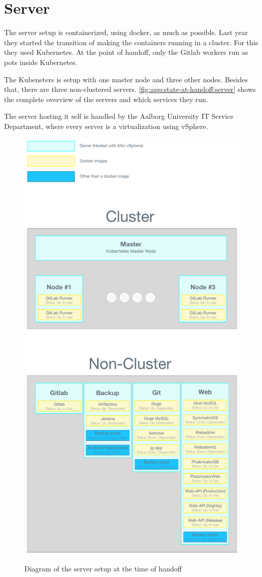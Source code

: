 \section{Server}\label{app:state-at-handoff:server}

The server setup is containerized, using docker, as much as possible. Last year they started the transition of making the containers running in a cluster. For this they used Kubernetes. At the point of handoff, only the Gitlab workers run as pots inside Kubernetes.

The Kubeneters is setup with one master node and three other nodes. Besides that, there are three non-clustered servers. \autoref{fig:app:state-at-handoff:server} shows the complete overview of the servers and which services they run.

The server hosting it self is handled by the Aalborg University IT Service Department, where every server is a virtualization using vSphere.

\begin{figure}[h]
    \centering
    \caption{Diagram of the server setup at the time of handoff}
    \includegraphics[height=1\textheight]{figures/Server-Overview.pdf}
    \label{fig:app:state-at-handoff:server}
\end{figure}
